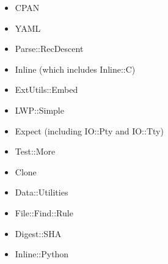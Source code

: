 \documentclass[12pt]{article}
\begin{document}
\begin{itemize}
   \item CPAN
   \item YAML
   \item Parse::RecDescent
   \item Inline (which includes Inline::C)
   \item ExtUtils::Embed
   \item LWP::Simple
   \item Expect (including IO::Pty and IO::Tty)
   \item Test::More
   \item Clone
   \item Data::Utilities
   \item File::Find::Rule
   \item Digest::SHA
   \item Inline::Python
\end{itemize}
\end{document}
